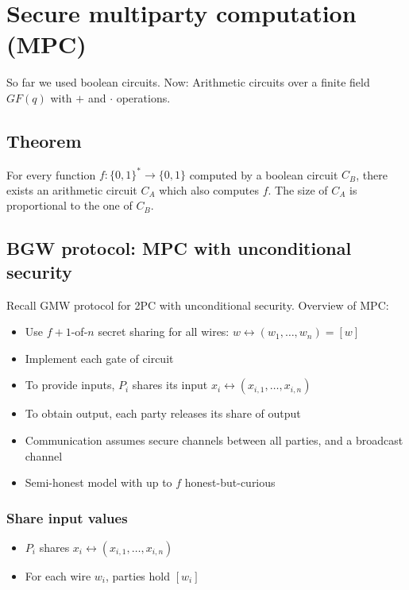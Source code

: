 \section{Secure multiparty computation (MPC)}

So far we used boolean circuits. Now: Arithmetic circuits over a finite field
$GF(q)$ with $+$ and $\cdot$ operations.

\subsection{Theorem}

For every function $f : \{0, 1\}^* \rightarrow \{0, 1\}$ computed by a boolean
circuit $C_B$, there exists an arithmetic circuit $C_A$ which also computes
$f$. The size of $C_A$ is proportional to the one of $C_B$.

\subsection{BGW protocol: MPC with unconditional security}

Recall GMW protocol for 2PC with unconditional security. Overview of MPC:
\begin{itemize}
  \item Use $f+1$-of-$n$ secret sharing for all wires: $w \leftrightarrow (w_1,
    \ldots, w_n) = [w]$
  \item Implement each gate of circuit
  \item To provide inputs, $P_i$ shares its input $x_i \leftrightarrow
    (x_{i,1}, \ldots, x_{i, n})$
  \item To obtain output, each party releases its share of output
  \item Communication assumes secure channels between all parties, and a
    broadcast channel
  \item Semi-honest model with up to $f$ honest-but-curious
\end{itemize}

\subsubsection{Share input values}

\begin{itemize}
  \item $P_i$ shares $x_i \leftrightarrow (x_{i,1}, \ldots, x_{i, n})$
  \item For each wire $w_i$, parties hold $[w_i]$
\end{itemize}

